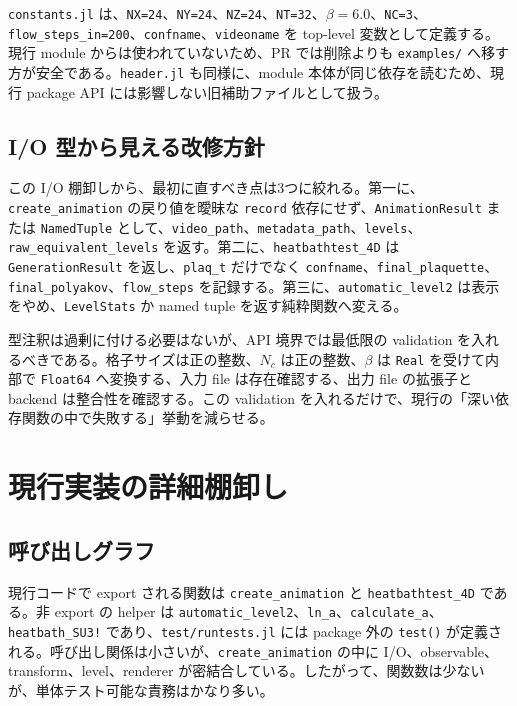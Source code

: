 \documentclass[uplatex,dvipdfmx,ja=standard,11pt,a4paper]{bxjsarticle}
\newcommand{\code}[1]{\texttt{#1}}
\begin{document}
\code{constants.jl} は、\code{NX=24}、\code{NY=24}、\code{NZ=24}、\code{NT=32}、\(\beta=6.0\)、\code{NC=3}、\code{flow\_steps\_in=200}、\code{confname}、\code{videoname} を top-level 変数として定義する\cite{VisualizingConstants}。現行 module からは使われていないため、PR では削除よりも \code{examples/} へ移す方が安全である。\code{header.jl} も同様に、module 本体が同じ依存を読むため、現行 package API には影響しない旧補助ファイルとして扱う\cite{VisualizingHeader}。

\subsection{I/O 型から見える改修方針}
この I/O 棚卸しから、最初に直すべき点は3つに絞れる。第一に、\code{create\_animation} の戻り値を曖昧な \code{record} 依存にせず、\code{AnimationResult} または \code{NamedTuple} として、\code{video\_path}、\code{metadata\_path}、\code{levels}、\code{raw\_equivalent\_levels} を返す。第二に、\code{heatbathtest\_4D} は \code{GenerationResult} を返し、\code{plaq\_t} だけでなく \code{confname}、\code{final\_plaquette}、\code{final\_polyakov}、\code{flow\_steps} を記録する。第三に、\code{automatic\_level2} は表示をやめ、\code{LevelStats} か named tuple を返す純粋関数へ変える。

型注釈は過剰に付ける必要はないが、API 境界では最低限の validation を入れるべきである。格子サイズは正の整数、\(N_c\) は正の整数、\(\beta\) は \code{Real} を受けて内部で \code{Float64} へ変換する、入力 file は存在確認する、出力 file の拡張子と backend は整合性を確認する。この validation を入れるだけで、現行の「深い依存関数の中で失敗する」挙動を減らせる。




\section{現行実装の詳細棚卸し}
\subsection{呼び出しグラフ}
現行コードで export される関数は \code{create\_animation} と \code{heatbathtest\_4D} である。非 export の helper は \code{automatic\_level2}、\code{ln\_a}、\code{calculate\_a}、\code{heatbath\_SU3!} であり、\code{test/runtests.jl} には package 外の \code{test()} が定義される\cite{VisualizingVisualization,VisualizingConfig,VisualizingTest}。呼び出し関係は小さいが、\code{create\_animation} の中に I/O、observable、transform、level、renderer が密結合している。したがって、関数数は少ないが、単体テスト可能な責務はかなり多い。
\end{document}
